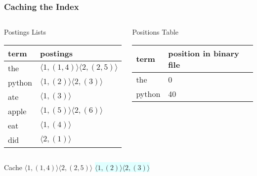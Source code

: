 \documentclass{beamer}
\begin{document}
\begin{frame}
  \frametitle{Caching the Index}

  \begin{columns}


    \begin{block}{Postings Lists}
      \begin{tabular}{ l | l }
        term & postings \\ \hline
        the & $ \langle 1,(1,4) \rangle \langle 2,(2,5) \rangle $ \\
        \rowcolor{LightCyan}
        python & $ \langle 1,(2) \rangle \langle 2,(3) \rangle $ \\
        ate & $ \langle 1,(3) \rangle $ \\
        apple & $ \langle 1,(5) \rangle \langle 2,(6) \rangle $ \\
        eat & $ \langle 1,(4) \rangle $ \\
        did & $ \langle 2,(1) \rangle $ \\
      \end{tabular}
    \end{block}


    \begin{block}{Positions Table}
      \begin{tabular}{ l | l }
        term & position in binary file \\ \hline
        the & 0 \\
        \rowcolor{LightCyan}
        python & 40 \\
      \end{tabular}
    \end{block}
    
  \end{columns}

  \begin{block}{Cache}
    $ \langle 1,(1,4) \rangle \langle 2,(2,5) \rangle $
    \colorbox{LightCyan}{$ \langle 1,(2) \rangle \langle 2,(3) \rangle $}
  \end{block}
\end{frame}
\end{document}
